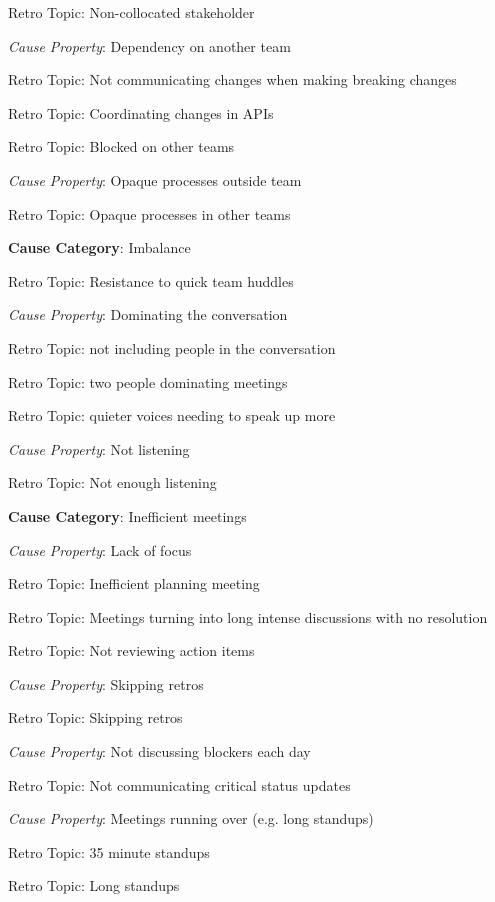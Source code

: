 \quad \quad \quad Retro Topic: Non-collocated stakeholder

\quad \quad \textit{Cause Property}: Dependency on another team

\quad \quad \quad Retro Topic: Not communicating changes when making breaking changes

\quad \quad \quad Retro Topic: Coordinating changes in APIs

\quad \quad \quad Retro Topic: Blocked on other teams

\quad \quad \textit{Cause Property}: Opaque processes outside team

\quad \quad \quad Retro Topic: Opaque processes in other teams

\quad \textbf{Cause Category}: Imbalance

\quad \quad Retro Topic: Resistance to quick team huddles

\quad \quad \textit{Cause Property}: Dominating the conversation

\quad \quad \quad Retro Topic: not including people in the conversation

\quad \quad \quad Retro Topic: two people dominating meetings

\quad \quad \quad Retro Topic: quieter voices needing to speak up more

\quad \quad \textit{Cause Property}: Not listening

\quad \quad \quad Retro Topic: Not enough listening

\quad \textbf{Cause Category}: Inefficient meetings

\quad \quad \textit{Cause Property}: Lack of focus

\quad \quad \quad Retro Topic: Inefficient planning meeting

\quad \quad \quad Retro Topic: Meetings turning into long intense discussions with no resolution

\quad \quad \quad Retro Topic: Not reviewing action items

\quad \quad \textit{Cause Property}: Skipping retros

\quad \quad \quad Retro Topic: Skipping retros

\quad \quad \textit{Cause Property}: Not discussing blockers each day

\quad \quad \quad Retro Topic: Not communicating critical status updates

\quad \quad \textit{Cause Property}: Meetings running over (e.g. long standups)

\quad \quad \quad Retro Topic: 35 minute standups

\quad \quad \quad Retro Topic: Long standups









